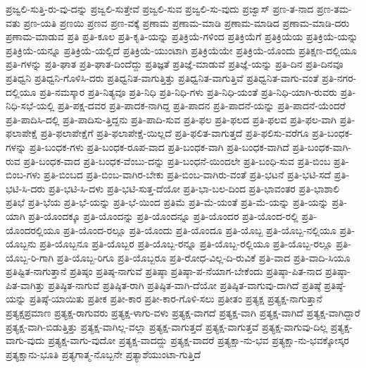 {ಪ್ರಜ್ವಲಿ-ಸುತ್ತಿ-ರು-ವು-ದನ್ನು
ಪ್ರಜ್ವಲಿ-ಸುತ್ತೇವೆ
ಪ್ರಜ್ವಲಿ-ಸುವ
ಪ್ರಜ್ವಲಿ-ಸು-ವುದು
ಪ್ರಜ್ವಾಸ್
ಪ್ರಣ-ತ-ನಾದ
ಪ್ರಣ-ತಮ-ವತು
ಪ್ರಣ-ಯತಿ
ಪ್ರಣಯಿ
ಪ್ರಣವ
ಪ್ರಣ-ವಕ್ಕೆ
ಪ್ರಣಾಮ
ಪ್ರಣಾಮ-ಮಾಡಿ
ಪ್ರಣಾಮ-ಮಾಡಿದ
ಪ್ರಣಾಮ-ಮಾಡಿ-ದರು
ಪ್ರಣಾಮ-ಮಾಡುವ
ಪ್ರತಿ
ಪ್ರತಿ-ಕೂಲ
ಪ್ರತಿ-ಕೃತಿ-ಯನ್ನು
ಪ್ರತಿಕ್ರಿಯೆ-ಗಳಿಂದ
ಪ್ರತಿಕ್ರಿಯೆಗೆ
ಪ್ರತಿಕ್ರಿಯೆಯ
ಪ್ರತಿಕ್ರಿಯೆ-ಯನ್ನು
ಪ್ರತಿಕ್ರಿಯೆ-ಯನ್ನೂ
ಪ್ರತಿಕ್ರಿಯೆ-ಯಲ್ಲಿದೆ
ಪ್ರತಿಕ್ರಿಯೆ-ಯುಂಟಾಗಿ
ಪ್ರತಿಕ್ರಿಯೆಯೇ
ಪ್ರತಿಕ್ರಿಯೆ-ಯೊಂದು
ಪ್ರತಿಕ್ಷಣ-ದಲ್ಲಿಯೂ
ಪ್ರತಿ-ಗಳನ್ನು
ಪ್ರತಿ-ಘಾತ
ಪ್ರತಿ-ಘಾತ-ದಿಂದೆದ್ದು
ಪ್ರತಿಜ್ಞತೆ
ಪ್ರತಿಜ್ಞೆ-ಮಾಡುವೆ
ಪ್ರತಿಜ್ಞೆ-ಯನ್ನು
ಪ್ರತಿ-ದಿನ
ಪ್ರತಿ-ದಿನವೂ
ಪ್ರತಿಧ್ವನಿ
ಪ್ರತಿಧ್ವನಿ-ಗೊಳಿಸಿ-ದರು
ಪ್ರತಿಧ್ವನಿತ-ವಾಗುತ್ತಿತ್ತು
ಪ್ರತಿಧ್ವನಿತ-ವಾಗುತ್ತಿವೆ
ಪ್ರತಿಧ್ವನಿತ-ವಾಗು-ವಂತೆ
ಪ್ರತಿ-ನಗರ-ದಲ್ಲಿಯೂ
ಪ್ರತಿ-ನಮಸ್ಕಾರ
ಪ್ರತಿ-ನಿತ್ಯವೂ
ಪ್ರತಿ-ನಿಧಿ
ಪ್ರತಿ-ನಿಧಿ-ಗಳು
ಪ್ರತಿ-ನಿಧಿ-ಯಂತೆ
ಪ್ರತಿ-ನಿಧಿ-ಯಾಗಿ-ರುವರು
ಪ್ರತಿ-ನಿಧಿ-ಸಭೆ-ಯಲ್ಲಿ
ಪ್ರತಿ-ಪಕ್ಷ-ದವರ
ಪ್ರತಿ-ಪಾದಕ-ನಾಗಿದ್ದ
ಪ್ರತಿ-ಪಾದನ
ಪ್ರತಿ-ಪಾದನೆ-ಯನ್ನು
ಪ್ರತಿ-ಪಾದನೆ-ಯೆಂದರೆ
ಪ್ರತಿ-ಪಾದಿಸಿ-ದಲ್ಲಿ
ಪ್ರತಿ-ಪಾದಿಸು-ತ್ತಿದ್ದನು
ಪ್ರತಿ-ಪಾದಿ-ಸುವ
ಪ್ರತಿ-ಫಲ
ಪ್ರತಿ-ಫಲದ
ಪ್ರತಿ-ಫಲವ
ಪ್ರತಿ-ಫಲ-ವಾಗಿ
ಪ್ರತಿ-ಫಲಾಪೇಕ್ಷೆ
ಪ್ರತಿ-ಫಲಾಪೇಕ್ಷೆಗೆ
ಪ್ರತಿ-ಫಲಾಪೇಕ್ಷೆ-ಯಿಲ್ಲದೆ
ಪ್ರತಿ-ಫಲಿತ-ವಾಗುತ್ತದೆ
ಪ್ರತಿ-ಫಲಿಸು-ವರೆಗೂ
ಪ್ರತಿ-ಬಂಧಕ-ಗಳನ್ನು
ಪ್ರತಿ-ಬಂಧಕ-ಗಳು
ಪ್ರತಿ-ಬಂಧಕ-ರೂಪ-ವಾದ
ಪ್ರತಿ-ಬಂಧಕ-ವಾಗಿ
ಪ್ರತಿ-ಬಂಧಕ-ವಾಗಿದೆ
ಪ್ರತಿ-ಬಂಧಕ-ವಾಗಿ-ರುವ
ಪ್ರತಿ-ಬಂಧಕ-ವಾದ
ಪ್ರತಿ-ಬಂಧಕ-ವೆಂಬು-ದನ್ನು
ಪ್ರತಿ-ಬಂಧನೆ-ಯಿಂದಲೇ
ಪ್ರತಿ-ಬಂಧಿ-ಸುವ
ಪ್ರತಿ-ಬಿಂಬ
ಪ್ರತಿ-ಬಿಂಬ-ಗಳು
ಪ್ರತಿ-ಬಿಂಬದ
ಪ್ರತಿ-ಬಿಂಬ-ವಾಗಿರ-ಬೇಕು
ಪ್ರತಿ-ಬಿಂಬ-ವಾಗಿರು-ವಂತೆ
ಪ್ರತಿ-ಭಟನೆ
ಪ್ರತಿ-ಭಟಿ-ಸದೆ
ಪ್ರತಿ-ಭಟಿ-ಸಿ-ದರು
ಪ್ರತಿ-ಭಟಿ-ಸಿ-ದಳು
ಪ್ರತಿ-ಭಟಿ-ಸುತ್ತ-ದೆಯೋ
ಪ್ರತಿ-ಭಾ-ಬಲ-ದಿಂದ
ಪ್ರತಿ-ಭಾವಂತರ
ಪ್ರತಿ-ಭಾಶಾಲಿ
ಪ್ರತಿಭೆ
ಪ್ರತಿ-ಭೆಯ
ಪ್ರತಿ-ಭೆ-ಯನ್ನು
ಪ್ರತಿ-ಭೆ-ಯಿಂದ
ಪ್ರತಿಮೆ
ಪ್ರತಿ-ಮೆ-ಯಂತೆ
ಪ್ರತಿ-ಮೆ-ಯನ್ನು
ಪ್ರತಿ-ಯನ್ನು
ಪ್ರತಿ-ಯಾಗಿ
ಪ್ರತಿ-ಯೊಂದಕ್ಕೂ
ಪ್ರತಿ-ಯೊಂದನ್ನು
ಪ್ರತಿ-ಯೊಂದನ್ನೂ
ಪ್ರತಿ-ಯೊಂದರ
ಪ್ರತಿ-ಯೊಂದ-ರಲ್ಲಿ
ಪ್ರತಿ-ಯೊಂದರಲ್ಲಿಯೂ
ಪ್ರತಿ-ಯೊಂದ-ರಲ್ಲೂ
ಪ್ರತಿ-ಯೊಂದು
ಪ್ರತಿ-ಯೊಂದೂ
ಪ್ರತಿ-ಯೊಬ್ಬ
ಪ್ರತಿ-ಯೊಬ್ಬ-ನಲ್ಲಿಯೂ
ಪ್ರತಿ-ಯೊಬ್ಬನು
ಪ್ರತಿ-ಯೊಬ್ಬನೂ
ಪ್ರತಿ-ಯೊಬ್ಬರ
ಪ್ರತಿ-ಯೊಬ್ಬ-ರನ್ನೂ
ಪ್ರತಿ-ಯೊಬ್ಬ-ರಲ್ಲಿಯೂ
ಪ್ರತಿ-ಯೊಬ್ಬ-ರಲ್ಲೂ
ಪ್ರತಿ-ಯೊಬ್ಬ-ರಿ-ಗಾಗಿ
ಪ್ರತಿ-ಯೊಬ್ಬ-ರಿಗೂ
ಪ್ರತಿ-ಯೊಬ್ಬರೂ
ಪ್ರತಿ-ರೋಧ-ವಿಲ್ಲ-ದಿ-ರುವಿಕೆ
ಪ್ರತಿ-ವಾದ
ಪ್ರತಿ-ವಾದಿ-ಸಿಯೂ
ಪ್ರತಿಷ್ಟಿತ-ನಾಗುತ್ತಾನೆ
ಪ್ರತಿಷ್ಠಂ
ಪ್ರತಿಷ್ಠ-ನಾಗುವೆ
ಪ್ರತಿಷ್ಠಾ
ಪ್ರತಿಷ್ಠಾ-ಪ-ನೆಯಾಗ-ಬೇಕೆಂದು
ಪ್ರತಿಷ್ಠಾ-ಪಿತ-ನಾದ
ಪ್ರತಿಷ್ಠಾ-ಪಿತ-ವಾಗಿತ್ತು
ಪ್ರತಿಷ್ಠಿತ-ನಾಗುವೆ
ಪ್ರತಿಷ್ಠಿತ-ರಾಗಿ
ಪ್ರತಿಷ್ಠಿತ-ವಾಗಿ-ದೆಯೋ
ಪ್ರತಿಷ್ಠಿತ-ವಾಗುವು-ದಾಗಿದೆ
ಪ್ರತಿಷ್ಠೆ
ಪ್ರತಿಷ್ಠೆ-ಯನ್ನು
ಪ್ರತಿಷ್ಠೆ-ಯಾಯಿತು
ಪ್ರತೀಕ
ಪ್ರತೀ-ಕಾರ
ಪ್ರತೀ-ಕಾರ-ಗೊಳಿ-ಸಲು
ಪ್ರತೀತಂ
ಪ್ರತ್ಯಕ್ಷ
ಪ್ರತ್ಯಕ್ಷ-ನಾಗುತ್ತಾನೆ
ಪ್ರತ್ಯಕ್ಷಪ್ರಮಾಣ
ಪ್ರತ್ಯಕ್ಷ-ರಾಗುವರು
ಪ್ರತ್ಯಕ್ಷ-ಳಾಗು-ವಳು
ಪ್ರತ್ಯಕ್ಷ-ವಾಗದೆ
ಪ್ರತ್ಯಕ್ಷ-ವಾಗಿ
ಪ್ರತ್ಯಕ್ಷ-ವಾಗಿದೆ
ಪ್ರತ್ಯಕ್ಷ-ವಾಗಿದ್ದಾರೆ
ಪ್ರತ್ಯಕ್ಷ-ವಾಗಿ-ಬಿಡುತ್ತಿತ್ತು
ಪ್ರತ್ಯಕ್ಷ-ವಾಗಿಲ್ಲ-ವಲ್ಲಾ
ಪ್ರತ್ಯಕ್ಷ-ವಾಗುತ್ತದೆ
ಪ್ರತ್ಯಕ್ಷ-ವಾಗುತ್ತವೆ
ಪ್ರತ್ಯಕ್ಷ-ವಾಗುವು-ದಿಲ್ಲ
ಪ್ರತ್ಯಕ್ಷ-ವಾಗು-ವುದು
ಪ್ರತ್ಯಕ್ಷ-ವಾಗು-ವುದೋ
ಪ್ರತ್ಯಕ್ಷ-ವಾದದ್ದು
ಪ್ರತ್ಯಕ್ಷ-ವಾದರೆ
ಪ್ರತ್ಯಕ್ಷಾ-ನು-ಭವ
ಪ್ರತ್ಯಕ್ಷಾ-ನು-ಭವಕ್ಕೋಸ್ಕರ
ಪ್ರತ್ಯಕ್ಷಾನು-ಭೂತಿ
ಪ್ರತ್ಯಗಾತ್ಮ-ನೊಬ್ಬನೇ
ಪ್ರತ್ಯಾಶೆಯುಂಟಾ-ಗುತ್ತಿದೆ
}
